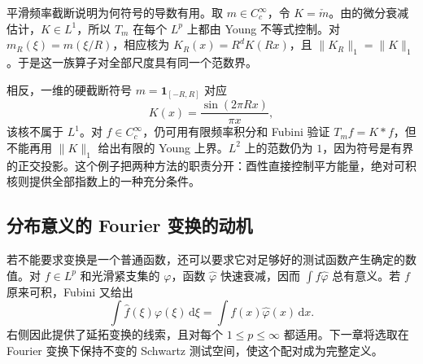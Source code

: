 \ProseParagraphBreak

平滑频率截断说明为何符号的导数有用。取 \(m\in C_c^\infty\)，令 \(K=\check m\)。由的微分衰减估计，\(K\in L^1\)，所以 \(T_m\) 在每个 \(L^p\) 上都由 Young 不等式控制。对 \(m_R(\xi)=m(\xi/R)\)，相应核为 \(K_R(x)=R^dK(Rx)\)，且 \(\|K_R\|_1=\|K\|_1\)。于是这一族算子对全部尺度具有同一个范数界。

\ProseParagraphBreak

相反，一维的硬截断符号 \(m=\mathbf1_{[-R,R]}\) 对应
\[
 K(x)=\dfrac{\sin(2\pi Rx)}{\pi x},
\]
该核不属于 \(L^1\)。对 \(f\in C_c^\infty\)，仍可用有限频率积分和 Fubini 验证 \(T_mf=K*f\)，但不能再用 \(\|K\|_1\) 给出有限的 Young 上界。\(L^2\) 上的范数仍为 \(1\)，因为符号是有界的正交投影。这个例子把两种方法的职责分开：酉性直接控制平方能量，绝对可积核则提供全部指数上的一种充分条件。

\subsection{分布意义的 Fourier 变换的动机}
\label{b2:subsec:040304}

若不能要求变换是一个普通函数，还可以要求它对足够好的测试函数产生确定的数值。对 \(f\in L^p\) 和光滑紧支集的 \(\varphi\)，函数 \(\widehat\varphi\) 快速衰减，因而 \(\int f\widehat\varphi\) 总有意义。若 \(f\) 原来可积，Fubini 又给出
\[
 \int\widehat f(\xi)\varphi(\xi)\,\mathrm{d}\xi
 =\int f(x)\widehat\varphi(x)\,\mathrm{d}x.
\]
右侧因此提供了延拓变换的线索，且对每个 \(1\leq p\leq\infty\) 都适用。下一章将选取在 Fourier 变换下保持不变的 Schwartz 测试空间，使这个配对成为完整定义。
